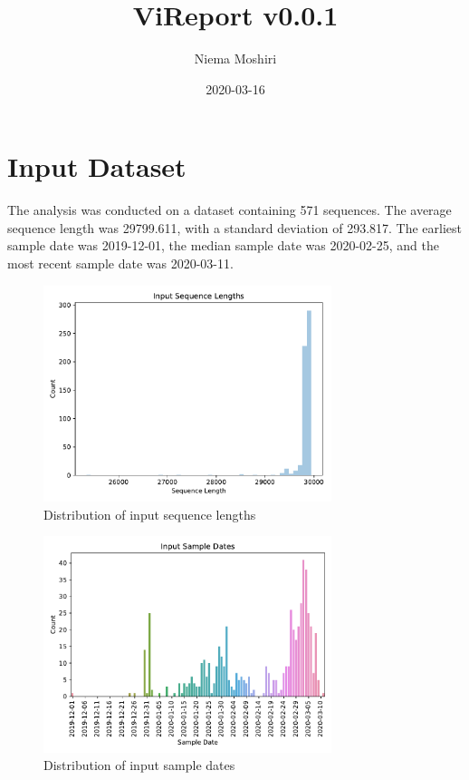 \documentclass{article}
\title{\vspace{-2.0cm}ViReport v0.0.1}
\author{Niema Moshiri}
\date{2020-03-16}
\begin{document}
\maketitle

\section{Input Dataset}
The analysis was conducted on a dataset containing 571 sequences.
The average sequence length was 29799.611,
with a standard deviation of 293.817.
The earliest sample date was 2019-12-01,
the median sample date was 2020-02-25,
and the most recent sample date was 2020-03-11.


\begin{figure}[h]
\centering
\includegraphics[width=0.75\textwidth,keepaspectratio]{./figs/input_sequence_lengths.pdf}
\caption{Distribution of input sequence lengths}
\end{figure}



\begin{figure}[h]
\centering
\includegraphics[width=0.75\textwidth,keepaspectratio]{./figs/input_sample_dates.pdf}
\caption{Distribution of input sample dates}
\end{figure}
\end{document}
